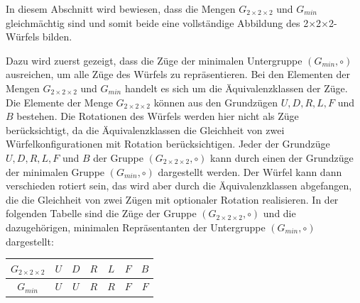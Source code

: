 \documentclass[12pt,a4paper, usenames, dvipsnames]{article}
\theoremstyle{mystyle}
\theoremstyle{definition}
\newcommand{\Gtwo}{\ensuremath{G_{2\times 2\times 2}}}
\newcommand{\Ttwo}{2$\times$2$\times$2-}
\begin{document}


In diesem Abschnitt wird bewiesen, dass die Mengen $\Gtwo$ und $G_{min}$ gleichmächtig sind und somit beide eine vollständige Abbildung des \Ttwo Würfels bilden. 

Dazu wird zuerst gezeigt, dass die Züge der minimalen Untergruppe $(G_{min}, \circ)$ ausreichen, um alle Züge des Würfels zu repräsentieren. Bei den Elementen der Mengen $\Gtwo$ und $G_{min}$ handelt es sich um die Äquivalenzklassen der Züge. Die Elemente der Menge $\Gtwo$ können aus den Grundzügen $U, D, R, L, F$ und $B$ bestehen. Die Rotationen des Würfels werden hier nicht als Züge berücksichtigt, da die Äquivalenzklassen die Gleichheit von zwei Würfelkonfigurationen mit Rotation berücksichtigen.
Jeder der Grundzüge $U, D, R, L, F$ und $B$ der Gruppe $(\Gtwo, \circ)$ kann durch einen der Grundzüge der minimalen Gruppe $(G_{min}, \circ)$ dargestellt werden. Der Würfel kann dann verschieden rotiert sein, das wird aber durch die Äquivalenzklassen abgefangen, die die Gleichheit von zwei Zügen mit optionaler Rotation realisieren. In der folgenden Tabelle sind die Züge der Gruppe $(\Gtwo, \circ)$ und die dazugehörigen, minimalen Repräsentanten der Untergruppe $(G_{min}, \circ)$ dargestellt:

\begin{center}
\begin{tabular}{c c c c c c c }
$\Gtwo$ & $U$ & $D$ & $R$  & $L$  & $F$  & $B$  \\
\midrule
$G_{min}$ & $U$ & $U$ & $R$  & $R$  & $F$  & $F$  \\
\end{tabular}
\end{center}
\end{document}
